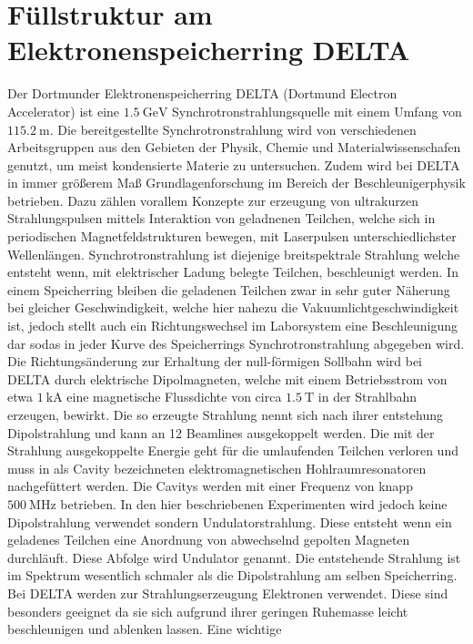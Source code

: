 \section{Füllstruktur am Elektronenspeicherring DELTA}
\label{sec:Einleitung}
Der Dortmunder Elektronenspeicherring DELTA (Dortmund Electron Accelerator) ist eine 
$\SI{1,5}{\giga\electronvolt}$ Synchrotronstrahlungsquelle mit einem Umfang von $\SI{115,2}{\meter}$.
Die bereitgestellte Synchrotronstrahlung wird von verschiedenen Arbeitsgruppen aus den Gebieten der 
Physik, Chemie und Materialwissenschafen genutzt, um meist kondensierte Materie zu untersuchen. Zudem 
wird bei DELTA in immer größerem Maß Grundlagenforschung im Bereich der Beschleunigerphysik betrieben.
Dazu zählen vorallem Konzepte zur erzeugung von ultrakurzen Strahlungspulsen mittels Interaktion von
geladnenen Teilchen, welche sich in periodischen Magnetfeldstrukturen bewegen, mit Laserpulsen 
unterschiedlichster Wellenlängen. Synchrotronstrahlung ist diejenige breitspektrale Strahlung welche 
entsteht wenn, mit elektrischer Ladung belegte Teilchen, beschleunigt werden. In einem Speicherring 
bleiben die geladenen Teilchen zwar in sehr guter Näherung bei gleicher Geschwindigkeit, welche hier 
nahezu die Vakuumlichtgeschwindigkeit ist, jedoch stellt auch ein Richtungswechsel im Laborsystem eine 
Beschleunigung dar sodas in jeder Kurve des Speicherrings Synchrotronstrahlung abgegeben wird. Die 
Richtungsänderung zur Erhaltung der null-förmigen Sollbahn wird bei DELTA durch elektrische Dipolmagneten, 
welche mit einem Betriebsstrom von etwa $\SI{1}{\kilo\ampere}$ eine magnetische Flussdichte von circa 
$\SI{1,5}{\tesla}$ in der Strahlbahn erzeugen, bewirkt. Die so erzeugte Strahlung nennt sich nach ihrer 
entstehung Dipolstrahlung und kann an 12 Beamlines ausgekoppelt werden. Die mit der Strahlung 
ausgekoppelte Energie geht für die umlaufenden Teilchen verloren und muss in als Cavity bezeichneten 
elektromagnetischen Hohlraumresonatoren nachgefüttert werden. Die Cavitys werden mit einer Frequenz von 
knapp $\SI{500}{\mega\hertz}$ betrieben. In den hier beschriebenen Experimenten wird jedoch keine 
Dipolstrahlung verwendet sondern Undulatorstrahlung. Diese entsteht wenn ein geladenes Teilchen eine 
Anordnung von abwechselnd gepolten Magneten durchläuft. Diese Abfolge wird Undulator genannt. Die 
entstehende Strahlung ist im Spektrum wesentlich schmaler als die Dipolstrahlung am selben Speicherring.
Bei DELTA werden zur Strahlungserzeugung Elektronen verwendet. Diese sind besonders geeignet da sie sich
aufgrund ihrer geringen Ruhemasse leicht beschleunigen und ablenken lassen. Eine wichtige 
